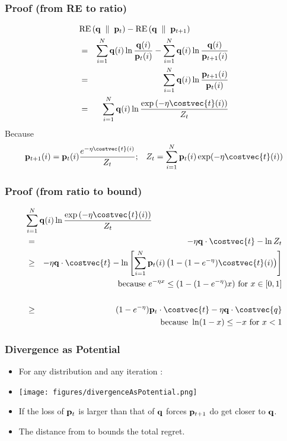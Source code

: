 \documentclass{beamer}
\begin{document}
\begingroup
\small
\begin{frame}
\frametitle{Proof (from RE to ratio)}
\begin{eqnarray*}
\lefteqn{\RE{\vecq}{\vecp_{t}} - \RE{\vecq}{\vecp_{t+1}}} \cr
  &=& \sum_{i=1}^N \vecq(i) \ln \frac{\vecq(i)}{\vecp_t(i)} -
      \sum_{i=1}^N \vecq(i) \ln \frac{\vecq(i)}{\vecp_{t+1}(i)} \cr
  & = & \sum_{i=1}^N \vecq(i) \ln \frac{\vecp_{t+1}(i)}{\vecp_t(i)}
        \cr
  & = & \sum_{i=1}^N \vecq(i) \ln \frac{\exp \left( -\eta
        \costvec{t}(i) \right)}{Z_t}
\end{eqnarray*}
Because
\[
\vecp_{t+1}(i) = \vecp_{t}(i)
\frac{e^{-\eta \costvec{t}(i)}}{Z_t};\;\;\;
Z_t = \sum_{i=1}^N \vecp_t(i)
        \exp( -\eta \costvec{t}(i))
  \]
\end{frame}

\begin{frame}
\frametitle{Proof (from ratio to bound)}
\begin{eqnarray*}
\lefteqn{\sum_{i=1}^N \vecq(i) \ln \frac{\exp \left( -\eta
  \costvec{t}(i) \right)}{Z_t}} \cr
  &=& -\eta \vecq \cdot \costvec{t} - \ln Z_t \cr
  &\geq& -\eta \vecq \cdot \costvec{t} - \ln\left[ \sum_{i=1}^N
         \vecp_t(i) \left(1-(1-e^{-\eta})\costvec{t}(i)
         \right)\right] \cr
  && \mbox{because } e^{-\eta x} \leq (1-(1-e^{-\eta})x) \mbox{ for } x
     \in [0,1] \cr \cr
     & \geq & (1 - e^{-\eta}) \vecp_t \cdot \costvec{t} - \eta \vecq
              \cdot \costvec{q} \cr
  && \mbox{because } \ln (1-x) \leq -x \mbox{ for } x<1
\end{eqnarray*}
\end{frame}

\endgroup

\newcommand{\grad}{\bigtriangledown}

\begin{frame}
\frametitle{Divergence as Potential}
\begin{itemize}
    \item For any distribution \R{$\vecq$} and any iteration 
    \B{$\ouralg$}:
\item
  \texttt{[image: figures/divergenceAsPotential.png]}
\item If the loss of ${\bf p}_{t}$ is larger than that of $\vecq$ forces
  ${\bf p}_{t+1}$ do get closer to $\vecq$.
\item The distance from  to \R{$\vecq^*$} bounds the total regret. 
\end{itemize}
\end{frame}
\end{document}
